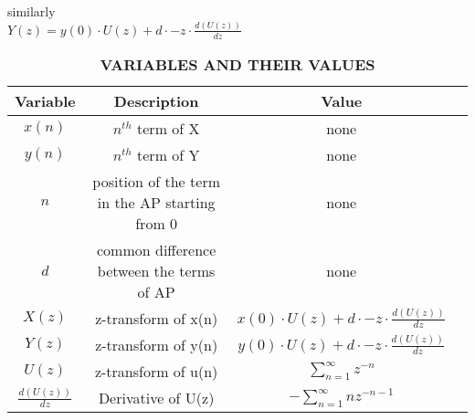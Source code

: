 \documentclass[journal,12pt,onecolumn]{IEEEtran}
\theoremstyle{remark}
\begin{document}
similarly \\

$Y(z) = y(0)\cdot U(z) + d\cdot{-z} \cdot \frac {d(U(z))}{dz} $ \\

\begin{table}
    \centering
    \begin{tabular}{|c|c|c|c|}
    \hline
       \textbf{Variable}& \textbf{Description}& \textbf{Value}\\\hline
         $x(n)$& $n^{th}$ term of X&none\\\hline
          $y(n)$& $n^{th}$ term of Y&none\\\hline
         $n$&   position of the term in the AP starting from 0&none\\\hline
          $d$&common difference between the terms of AP&none\\\hline
          $X(z)$& z-transform of x(n)&$x(0)\cdot U(z) + d\cdot{-z} \cdot \frac {d(U(z))}{dz}$ \\\hline
         $Y(z)$& z-transform of y(n)&$y(0)\cdot U(z) + d\cdot{-z} \cdot \frac {d(U(z))}{dz}$\\\hline
          $U(z)$& z-transform of u(n)& $\sum_{ n=1}^{\infty} z^{-n}$\\\hline
         $\frac{d(U(z))}{dz}$& Derivative of U(z)&$-\sum_{n=1}^{\infty}nz^{-n-1}$\\\hline
         
    \end{tabular}
    \caption{\textbf{VARIABLES AND THEIR VALUES}}
    \label{tab:my_label}
\end{table}
\end{document}
